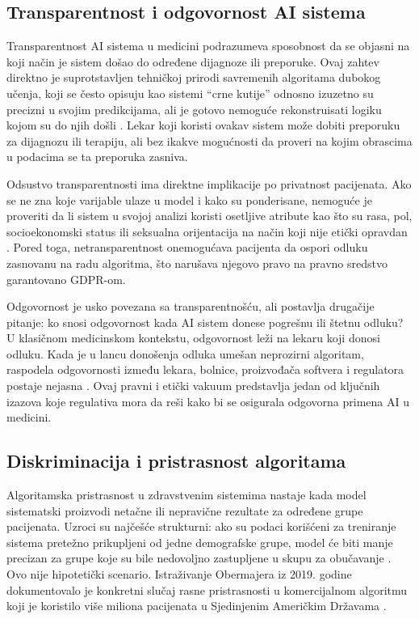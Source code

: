 \documentclass[12pt]{article}
\begin{document}
 
 
\subsection{Transparentnost i odgovornost AI sistema}
Transparentnost AI sistema u medicini podrazumeva sposobnost da se objasni na koji način je sistem došao do određene dijagnoze ili preporuke. Ovaj zahtev direktno je suprotstavljen tehničkoj prirodi savremenih algoritama dubokog učenja, koji se često opisuju kao sistemi ``crne kutije'' odnosno izuzetno su precizni u svojim predikcijama, ali je gotovo nemoguće rekonstruisati logiku kojom su do njih došli \cite{topol2019}. Lekar koji koristi ovakav sistem može dobiti preporuku za dijagnozu ili terapiju, ali bez ikakve mogućnosti da proveri na kojim obrascima u podacima se ta preporuka zasniva.
 
Odsustvo transparentnosti ima direktne implikacije po privatnost pacijenata. Ako se ne zna koje varijable ulaze u model i kako su ponderisane, nemoguće je proveriti da li sistem u svojoj analizi koristi osetljive atribute kao što su rasa, pol, socioekonomski status ili seksualna orijentacija na način koji nije etički opravdan \cite{obermeyer2019}. Pored toga, netransparentnost onemogućava pacijenta 
da ospori odluku zasnovanu na radu algoritma, što narušava njegovo pravo na pravno sredstvo garantovano GDPR-om.
 
Odgovornost je usko povezana sa transparentnošću, ali postavlja drugačije pitanje: ko snosi odgovornost kada AI sistem donese pogrešnu ili 
štetnu odluku? U klasičnom medicinskom kontekstu, odgovornost leži na lekaru koji donosi odluku. Kada je u lancu donošenja odluka umešan neprozirni algoritam, raspodela odgovornosti između lekara, bolnice, proizvođača softvera i regulatora postaje nejasna \cite{kumar2025}. Ovaj pravni i etički vakuum predstavlja jedan od ključnih izazova koje regulativa mora da reši kako bi se osigurala odgovorna primena AI u medicini.
 
 
\subsection{Diskriminacija i pristrasnost algoritama}
Algoritamska pristrasnost u zdravstvenim sistemima nastaje kada model sistematski proizvodi netačne ili nepravične rezultate za određene 
grupe pacijenata. Uzroci su najčešće strukturni: ako su podaci korišćeni za treniranje sistema pretežno prikupljeni od jedne demografske grupe, model će biti manje precizan za grupe koje su bile nedovoljno zastupljene u skupu za obučavanje \cite{abouelmehdi2017}. Ovo nije hipotetički scenario. Istraživanje Obermajera iz 2019. godine dokumentovalo je konkretni slučaj rasne pristrasnosti u komercijalnom algoritmu koji je koristilo više miliona pacijenata u Sjedinjenim Američkim Državama \cite{obermeyer2019}.
 
\end{document}
